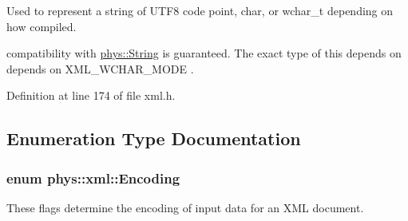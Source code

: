Used to represent a string of UTF8 code point, char, or wchar\_\-t depending on how compiled. 

compatibility with \hyperlink{namespacephys_aa03900411993de7fbfec4789bc1d392e}{phys::String} is guaranteed. The exact type of this depends on depends on XML\_\-WCHAR\_\-MODE . 

Definition at line 174 of file xml.h.



\subsection{Enumeration Type Documentation}
\hypertarget{namespacephys_1_1xml_a420f5de782438f88160321385bea2015}{
\subsubsection[{Encoding}]{\setlength{\rightskip}{0pt plus 5cm}enum {\bf phys::xml::Encoding}}}
\label{d9/d27/namespacephys_1_1xml_a420f5de782438f88160321385bea2015}


These flags determine the encoding of input data for an XML document. 

